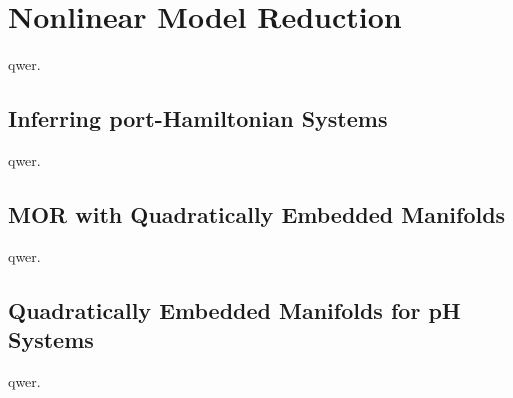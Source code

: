 \chapter{Nonlinear Model Reduction}\label{chap:nonlinear-mor}

qwer.

\section{Inferring port-Hamiltonian Systems}\label{sec:inferring-ph-systems}

qwer.

\section{MOR with Quadratically Embedded Manifolds}\label{sec:mor-quadratically-embedded-manifolds}

qwer.

\section{Quadratically Embedded Manifolds for pH Systems}\label{sec:quadratically-embedded-manifolds-ph-systems}

qwer.
